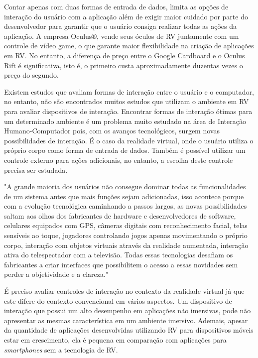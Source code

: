 Contar apenas com duas formas de entrada de dados, limita as opções de interação do usuário com a aplicação além de exigir maior cuidado por parte do desenvolvedor para garantir que o usuário consiga realizar todas as ações da aplicação. A empresa Oculus®, vende seus óculos de RV juntamente com um controle de vídeo game, o que garante maior flexibilidade na criação de aplicações em RV. No entanto, a diferença de preço entre o Google Cardboard e o Oculus Rift é significativa, isto é,  o primeiro custa aproximadamente duzentas vezes o preço do segundo.

Existem estudos que avaliam formas de interação entre o usuário e o computador, no entanto, não são encontrados muitos estudos que utilizam o ambiente em RV para avaliar dispositivos de interação. Encontrar formas de interação ótimas para um determinado ambiente é um problema muito estudado na área de Interação Humano-Computador pois, com os avanços tecnológicos, surgem novas possibilidades de interação. É o caso da realidade virtual, onde o usuário utiliza o próprio corpo como forma de entrada de dados. Também é possível utilizar um controle externo para ações adicionais, no entanto, a escolha deste controle precisa ser estudada.

\begin{citacao}
"A grande maioria dos usuários não consegue dominar todas as funcionalidades de um sistema antes que mais funções sejam adicionadas, isso acontece porque com a evolução tecnológica caminhando a passos largos, as novas possibilidades saltam aos olhos dos fabricantes de hardware e desenvolvedores de software, celulares equipados com GPS, câmeras digitais com reconhecimento facial, telas sensíveis ao toque, jogadores controlando jogos apenas movimentando o próprio corpo, interação com objetos virtuais através da realidade aumentada, interação ativa do telespectador com a televisão. Todas essas tecnologias desafiam os fabricantes a criar interfaces que possibilitem o acesso a essas novidades sem perder a objetividade e a clareza." \cite{oliveira}
\end{citacao}

É preciso avaliar controles de interação no contexto da realidade virtual já que este difere do contexto convencional em vários aspectos. Um dispositivo de interação que possui um alto desempenho em aplicações não imersivas, pode não apresentar as mesmas característica em um ambiente imersivo. Ademais, apesar da quantidade de aplicações desenvolvidas utilizando RV para dispositivos móveis estar em crescimento, ela é pequena em comparação com aplicações para \textit{smartphones} sem a tecnologia de RV.  

